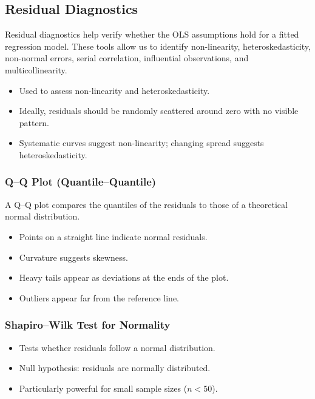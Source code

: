 \documentclass[10pt,a4paper]{article}
\begin{document}
	\subsection{Residual Diagnostics}

	Residual diagnostics help verify whether the OLS assumptions hold for a fitted regression model.
	These tools allow us to identify non-linearity, heteroskedasticity, non-normal errors, serial correlation,
	influential observations, and multicollinearity.

	\begin{itemize}
		\item Used to assess non-linearity and heteroskedasticity.
		\item Ideally, residuals should be randomly scattered around zero with no visible pattern.
		\item Systematic curves suggest non-linearity; changing spread suggests heteroskedasticity.
	\end{itemize}


	\subsubsection{Q--Q Plot (Quantile--Quantile)}

	A Q--Q plot compares the quantiles of the residuals to those of a theoretical normal distribution.



	\begin{itemize}
		\item Points on a straight line indicate normal residuals.
		\item Curvature suggests skewness.
		\item Heavy tails appear as deviations at the ends of the plot.
		\item Outliers appear far from the reference line.
	\end{itemize}

	\subsubsection{Shapiro--Wilk Test for Normality}

	\begin{itemize}
		\item Tests whether residuals follow a normal distribution.
		\item Null hypothesis: residuals are normally distributed.
		\item Particularly powerful for small sample sizes ($n < 50$).
	\end{itemize}
\end{document}
